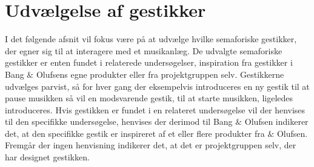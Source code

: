\section{Udvælgelse af gestikker}
\label{UdvaelgelseAfGestikker}
%
I det følgende afsnit vil fokus være på at udvælge hvilke semaforiske gestikker, der egner sig til at interagere med et musikanlæg. De udvalgte semaforiske gestikker er enten fundet i relaterede undersøgelser, inspiration fra gestikker i Bang $\&$ Olufsens egne produkter eller fra projektgruppen selv. Gestikkerne udvælges parvist, så for hver gang der eksempelvis introduceres en ny gestik til at pause musikken så vil en modsvarende gestik, til at starte musikken, ligeledes introduceres. Hvis gestikken er fundet i en relateret undersøgelse vil der henvises til den specifikke undersøgelse, henvises der derimod til Bang $\&$ Olufsen indikerer det, at den specifikke gestik er	inspireret af et eller flere produkter fra $\&$ Olufsen. Fremgår der ingen henvisning indikerer det, at det er projektgruppen selv, der har designet gestikken.  

